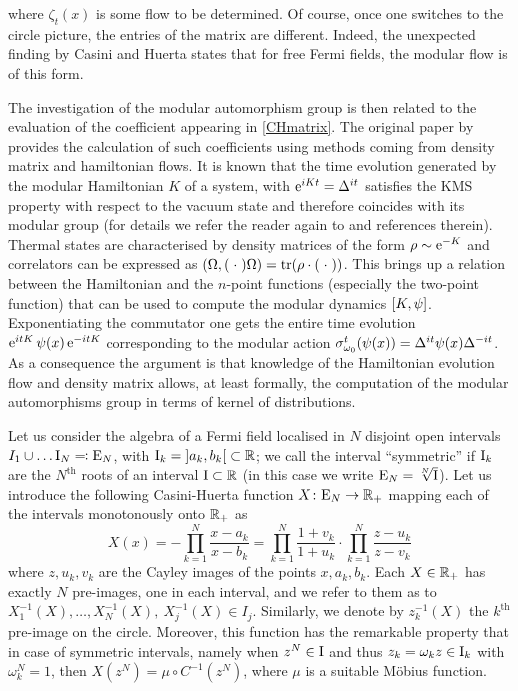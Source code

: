  where $\zeta_t(x)$ is some flow to be determined.
 Of course, once one switches to the circle picture, the 
 entries of the matrix are different. Indeed, the 
 unexpected finding by Casini and Huerta states 
 that for free Fermi fields, the modular flow is of this form.
 
 \bigskip
 The investigation of the modular automorphism group is
 then related to the evaluation of the coefficient appearing
 in \eqref{CHmatrix}. The original paper by \cite{CH:2009}
 provides the calculation of such coefficients using methods
 coming from density matrix and hamiltonian flows. It is 
 known that the time evolution generated by the modular 
 Hamiltonian $K$ of a system, with $\operatorname{e}^{iKt}=\Delta^{it}$  
 satisfies the \ac{KMS} property with 
 respect to the vacuum state and therefore coincides with
 its modular group (for details we refer the reader again to
 \cite{CH:2009} and references therein). Thermal states are 
 characterised by density matrices of the form $\rho\sim 
 \operatorname{e}^{-K}$ and correlators can be expressed as 
 $(\Omega,(\;{\cdot}\;)\Omega)= \operatorname{tr}(\rho\cdot(\;{\cdot}\;))$. 
 This brings up a relation between the Hamiltonian
 and the $n$-point functions (especially the two-point
 function) that can be used to compute the modular
 dynamics $[K,\psi]$. Exponentiating the commutator
 one gets the entire time evolution $\operatorname{e}^{itK}\psi(x)
 \operatorname{e}^{-itK}$ corresponding to the modular action 
 $\sigma^t_{\omega_0}(\psi(x))=\Delta^{it}\psi(x)\Delta^{-it}$. 
 As a consequence the argument is that knowledge 
 of the Hamiltonian evolution 
 flow and density matrix allows, at least formally, 
 the computation of the modular automorphisms group in 
 terms of kernel of distributions. 
 
 \bigskip
 Let us consider the algebra of a Fermi field localised 
 in $N$ disjoint 
 open intervals $I_1\cup\ldots\textrm{I}_N\eqqcolon\textrm{E}_N$,
 with $\textrm{I}_k=\mathopen{]}a_k,b_k\mathclose{[} \subset \mathbb{R}$;
 we call the interval ``symmetric'' if $\textrm{I}_k$ are the 
 $N^{\textrm{th}}$
 roots of an interval $\textrm{I}\subset\mathbb{R}$ (in this case we write
 $\textrm{E}_N=\sqrt[N]{\textrm{I}}$). 
 Let us introduce the following Casini-Huerta
 function $X\colon\textrm{E}_N\to\mathbb{R}_+$ mapping each of the
 intervals monotonously onto $\mathbb{R}_+$ as
 \begin{equation}
 \label{CHfunction}
 X(x)=-\prod_{k=1}^N\frac{x-a_k}{x-b_k}=
 \prod_{k=1}^N\frac{1+v_k}{1+u_k}\cdot\prod_{k=1}^N
 \frac{z-u_k}{z-v_k}
 \end{equation}
 where $z,u_k,v_k$ are the Cayley images of the points
 $x,a_k,b_k$. Each $X\in\mathbb{R}_+$ has exactly $N$ pre-images,
 one in each interval, and we refer to them as to
 $X_1^{-1}(X),\ldots,X_N^{-1}(X),\ X_j^{-1}(X)\in I_j$. 
 Similarly, we denote by $z_k^{-1}(X)$ the $k^{\textrm{th}}$ 
 pre-image on the circle. Moreover, this function has the
 remarkable property that in case of symmetric intervals,
 namely when $z^N\in\textrm{I}$ and thus $z_k=\omega_k z\in\textrm{I}_k$
 with $\omega_k^N=1$, then $X(z^N)=\mu\circ C^{-1}(z^N)$, where
 $\mu$ is a suitable M\"{o}bius function.
 
